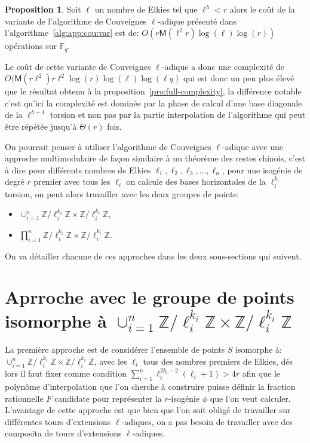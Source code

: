 \documentclass[10pt,a4paper]{book}
\theoremstyle{plain}
\theoremstyle{definition}
\theoremstyle{definition}
\theoremstyle{definition}
\newtheorem{prop}[thm]{Proposition}
\theoremstyle{definition}
\theoremstyle{remark}
\theoremstyle{remark}
\theoremstyle{definition}
\begin{document}
\begin{prop}
Soit $\ell$ un nombre de Elkies tel que $\ell^h<r$ alors le coût de la 
variante de l'algorithme de Couveignes $\ell$-adique présenté dans 
l'algorithme~\ref{alg:app:cou:var} 
est de: 
$O(r\mathsf{M}(\ell^2r)\log(\ell)\log(r))$ opérations sur $\mathbb{F}_q$.
\end{prop}

Le coût de cette variante de Couveignes $\ell$-adique a donc une complexité de
$O(\mathsf{M}(r\ell^2)r\ell^2 \log(r) \log(\ell) \log(\ell q)$ qui est donc un 
peu plus élevé que le résultat obtenu à la 
proposition~\ref{pro:full-complexity}, la différence notable c'est qu'ici la 
complexité est dominée par la phase de calcul d'une base diagonale de la 
$\ell^{h+1}$ torsion et non pas par la partie interpolation de l'algorithme qui
peut être répétée jusqu'à $\Theta(r)$ fois.


On pourrait penser à utiliser l'algorithme de Couveignes $\ell$-adique avec une
approche multimodulaire de façon similaire à un théorème des restes chinois, 
c'est à dire pour différents nombres de Elkies $\ell_1, \ell_2, \ell_3, \dots, 
\ell_{n}$, pour une isogénie de degré $r$ premier avec tous les $\ell_i$ on 
calcule des bases horizontales de la $\ell_i^{k_i}$ torsion, on peut alors 
travailler avec les deux groupes de points:
\begin{itemize}
\item $\cup_{i=1}^n \mathbb{Z}/\ell_i^{k_i} \mathbb{Z} \times \mathbb{Z}/\ell_i^{k_i} \mathbb{Z}$, 
\item $\prod_{i=1}^n \mathbb{Z}/\ell_i^{k_i} \mathbb{Z} \times \mathbb{Z}/\ell_i^{k_i} \mathbb{Z} $.
\end{itemize}
On va détailler chacune de ces approches dans les deux sous-sections qui suivent.

\section{Aprroche avec le groupe de points isomorphe à $\cup_{i=1}^n \mathbb{Z}/\ell_i^{k_i} \mathbb{Z} \times \mathbb{Z}/\ell_i^{k_i} \mathbb{Z}$}
La première approche est de considérer l'ensemble de points $S$ isomorphe à: 
$\cup_{i=1}^n \mathbb{Z}/\ell_i^{k_i} \mathbb{Z} \times \mathbb{Z}/\ell_i^{k_i} \mathbb{Z} $,
avec les $\ell_i$ tous des nombres premiers de Elkies, dés lors il faut fixer comme 
condition  $\sum_{i=1}^n\ell_i^{2k_{i}-2}(\ell_i+1)>4r$
afin que le polynôme d'interpolation que l'on cherche à construire puisse 
définir la fraction rationnelle $F$ candidate pour représenter la $r$-isogénie 
$\phi$ que l'on veut calculer. 
L'avantage de cette approche est que bien que l'on soit obligé de travailler
sur différentes tours d'extensions $\ell$-adiques, on a pas besoin de 
travailler avec des composita de tours d'extensions $\ell$-adiques.
\end{document}
